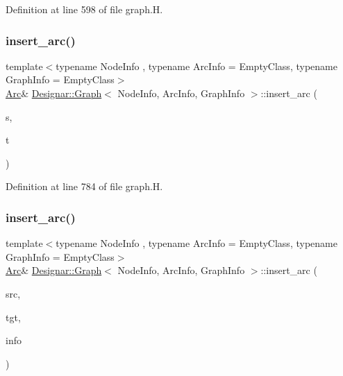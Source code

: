Definition at line 598 of file graph.\+H.

\mbox{\label{class_designar_1_1_graph_a794e687e21db6f4e00e14c6bdc5c2907}} 
\subsubsection{\texorpdfstring{insert\+\_\+arc()}{insert\_arc()}\hspace{0.1cm}{\footnotesize\ttfamily [2/4]}}
{\footnotesize\ttfamily template$<$typename Node\+Info , typename Arc\+Info  = Empty\+Class, typename Graph\+Info  = Empty\+Class$>$ \\
\hyperlink{class_designar_1_1_graph_a74c730ef4ce2d20f998d72bd25c2b5bf}{Arc}\& \hyperlink{class_designar_1_1_graph}{Designar\+::\+Graph}$<$ Node\+Info, Arc\+Info, Graph\+Info $>$\+::insert\+\_\+arc (\begin{DoxyParamCaption}\item[{\hyperlink{class_designar_1_1_graph_a5dfc7dba9d092ac489c72e40390c37d0}{Node} \&}]{s,  }\item[{\hyperlink{class_designar_1_1_graph_a5dfc7dba9d092ac489c72e40390c37d0}{Node} \&}]{t }\end{DoxyParamCaption})\hspace{0.3cm}{\ttfamily [inline]}}



Definition at line 784 of file graph.\+H.

\mbox{\label{class_designar_1_1_graph_ad310a106f10d0a7ff12915d8b47e8e3d}} 
\subsubsection{\texorpdfstring{insert\+\_\+arc()}{insert\_arc()}\hspace{0.1cm}{\footnotesize\ttfamily [3/4]}}
{\footnotesize\ttfamily template$<$typename Node\+Info , typename Arc\+Info  = Empty\+Class, typename Graph\+Info  = Empty\+Class$>$ \\
\hyperlink{class_designar_1_1_graph_a74c730ef4ce2d20f998d72bd25c2b5bf}{Arc}\& \hyperlink{class_designar_1_1_graph}{Designar\+::\+Graph}$<$ Node\+Info, Arc\+Info, Graph\+Info $>$\+::insert\+\_\+arc (\begin{DoxyParamCaption}\item[{\hyperlink{class_designar_1_1_graph_a5dfc7dba9d092ac489c72e40390c37d0}{Node} \&}]{src,  }\item[{\hyperlink{class_designar_1_1_graph_a5dfc7dba9d092ac489c72e40390c37d0}{Node} \&}]{tgt,  }\item[{const Arc\+Info \&}]{info }\end{DoxyParamCaption})\hspace{0.3cm}{\ttfamily [inline]}}



